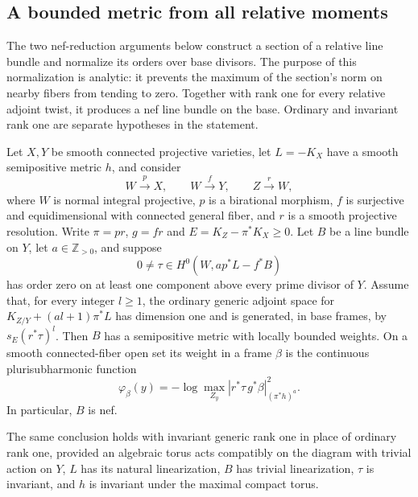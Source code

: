 \subsection{A bounded metric from all relative moments}
\label{V:sec-maximum}

The two nef-reduction arguments below construct a section of a
relative line bundle and normalize its orders over base divisors.
The purpose of this normalization is analytic: it prevents the
maximum of the section's norm on nearby fibers from tending to zero.
Together with rank one for every relative adjoint twist, it produces
a nef line bundle on the base.  Ordinary and invariant rank one
are separate hypotheses in the statement.

\begin{lemma}\label{V:bounded-maximum}
Let $X,Y$ be smooth connected projective varieties, let
$L=-K_X$ have a smooth semipositive metric $h$, and consider
\[
 W\xrightarrow{p}X,\qquad W\xrightarrow{f}Y,
 \qquad Z\xrightarrow{r}W,
\]
where $W$ is normal integral projective, $p$ is a birational morphism,
$f$ is surjective and
equidimensional with connected general fiber, and $r$ is a smooth
projective resolution.  Write $\pi=pr$, $g=fr$ and
$E=K_Z-\pi^*K_X\ge0$.  Let $B$ be a line bundle on $Y$, let $a\in\mathbb Z_{>0}$,
and suppose
\[
 0\ne\tau\in H^0(W,ap^*L-f^*B)
\]
has order zero on at least one component above every prime divisor
of $Y$.  Assume that, for every integer $l\ge1$, the ordinary
generic adjoint space for
$K_{Z/Y}+(al+1)\pi^*L$ has dimension one and is generated, in
base frames, by $s_E(r^*\tau)^l$.
Then $B$ has a semipositive metric with locally bounded weights.
On a smooth connected-fiber open set its weight in a frame $\beta$
is the continuous plurisubharmonic function
\begin{equation}\label{V:sup-weight}
 \varphi_\beta(y)=-\log\max_{Z_y}
       |r^*\tau\,g^*\beta|^2_{(\pi^*h)^a}.
\end{equation}
In particular, $B$ is nef.

The same conclusion holds with invariant generic rank one in place
of ordinary rank one, provided an algebraic torus acts compatibly
on the diagram with trivial action on $Y$, $L$ has its natural
linearization, $B$ has trivial linearization, $\tau$ is invariant,
and $h$ is invariant under the maximal compact torus.
\end{lemma}

